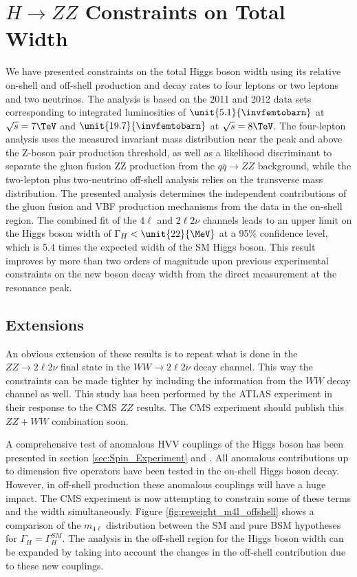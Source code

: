\section{\texorpdfstring{$H \to ZZ$}{H to ZZ} Constraints on Total Width}
\label{sec:Summary_TotalWidth}


We have presented constraints on the total Higgs boson width using its relative
on-shell and off-shell production and decay rates to four leptons or two leptons and two
neutrinos. The analysis is based on the 2011 and 2012 data sets corresponding to integrated
luminosities of $\unit{5.1}{\invfemtobarn}$ at $\sqrt{s} = 7\TeV$ and  $\unit{19.7}{\invfemtobarn}$ at $\sqrt{s} = 8\TeV$.
The four-lepton analysis uses the measured invariant mass distribution near the peak and
above the Z-boson pair production threshold, as well as a likelihood discriminant to separate
the gluon fusion ZZ production from the $q\bar{q} \to ZZ$ background,
while the two-lepton plus two-neutrino off-shell analysis relies on the transverse mass distribution.
The presented analysis determines the independent contributions of the gluon fusion and VBF production
mechanisms from the data in the on-shell region. 
The combined fit of the $4\ell$ and $2\ell 2\nu$ channels leads to an upper limit on the Higgs boson
width of $\Gamma_{H} < \unit{22}{\MeV}$ at a 95\% confidence level, which is 5.4 times the expected
width of the SM Higgs boson. This result improves by more than two orders of magnitude upon previous
experimental constraints on the new boson decay width from the direct measurement at the resonance peak.

\subsection{Extensions}

An obvious extension of these results is to repeat what is done in the $ZZ \to 2\ell2\nu$ final state in the $WW \to 2\ell2\nu$ decay channel. This way the constraints can be made tighter by including the information from the $WW$ decay channel as well. This study has been performed by the ATLAS experiment \cite{Aad:2015xua} in their response to the CMS $ZZ$ results. The CMS experiment should publish this $ZZ+WW$ combination soon.

A comprehensive test of anomalous HVV couplings of the Higgs boson has been presented in section \ref{sec:Spin_Experiment} and \cite{Khachatryan:2014kca}. All anomalous contributions up to dimension
five operators have been tested in the on-shell Higgs boson decay. However, in off-shell production these anomalous couplings will have a huge impact. The CMS experiment is now attempting to constrain some of these terms and the width simultaneously. Figure \ref{fig:reweight_m4l_offshell} shows a comparison of the $m_{4\ell}$ distribution between the SM and pure BSM hypotheses for $\Gamma_{H}=\Gamma_{H}^{SM}$. The analysis in the off-shell region for the Higgs boson width can be expanded by taking into account the changes in the off-shell contribution due to these new couplings.

